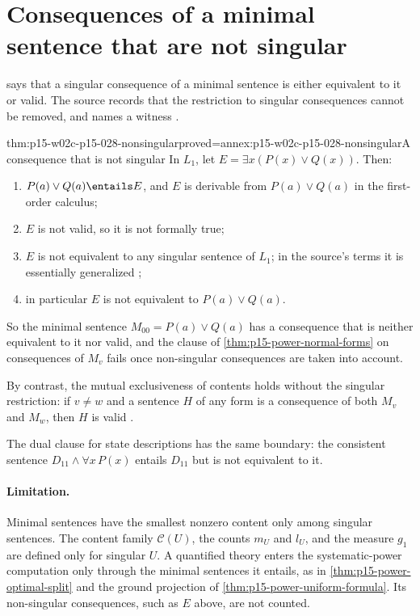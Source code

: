 \section{Consequences of a minimal sentence that are not singular}
\label{sec:p15-w02c-p15-028-boundary}

 says that a singular consequence of a
minimal sentence is either equivalent to it or valid. The source
records that the restriction to singular consequences cannot be
removed, and names a witness
\cite[p.~166]{HempelOppenheim1948Explanation}.

\begin{hbtheorem}{thm:p15-w02c-p15-028-nonsingular}{proved=annex:p15-w02c-p15-028-nonsingular}{A consequence that is not singular}
In \(L_1\), let \(E=\exists x(P(x)\lor Q(x))\). Then:
\begin{enumerate}
\item \(P(a)\lor Q(a)\entails E\), and \(E\) is derivable from
  \(P(a)\lor Q(a)\) in the first-order calculus;
\item \(E\) is not valid, so it is not formally true;
\item \(E\) is not equivalent to any singular sentence of \(L_1\); in
  the source's terms it is essentially generalized
  \cite[p.~158, (7.1c)]{HempelOppenheim1948Explanation};
\item in particular \(E\) is not equivalent to \(P(a)\lor Q(a)\).
\end{enumerate}
So the minimal sentence \(M_{00}=P(a)\lor Q(a)\) has a consequence that
is neither equivalent to it nor valid, and the clause of
\cref{thm:p15-power-normal-forms} on consequences of \(M_v\) fails once
non-singular consequences are taken into account.

By contrast, the mutual exclusiveness of contents holds without the
singular restriction: if \(v\neq w\) and a sentence \(H\) of any form
is a consequence of both \(M_v\) and \(M_w\), then \(H\) is valid
\cite[p.~166]{HempelOppenheim1948Explanation}.

The dual clause for state descriptions has the same boundary: the
consistent sentence \(D_{11}\land\forall x\,P(x)\) entails \(D_{11}\)
but is not equivalent to it.
\end{hbtheorem}

\paragraph{Limitation.}
Minimal sentences have the smallest nonzero content only among singular
sentences. The content family \(\mathcal C(U)\), the counts \(m_U\) and
\(l_U\), and the measure \(g_1\) are defined only for singular \(U\).
A quantified theory enters the systematic-power computation only through
the minimal sentences it entails, as in \cref{thm:p15-power-optimal-split}
and the ground projection of \cref{thm:p15-power-uniform-formula}.
Its non-singular consequences, such as \(E\) above, are not counted.


